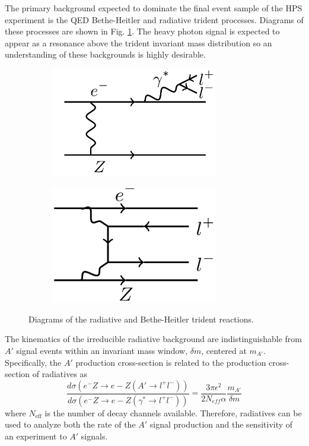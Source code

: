 The primary background expected to dominate the final event sample of the HPS 
experiment is the QED Bethe-Heitler and radiative trident processes.  Diagrams
of these processes are shown in Fig. \ref{fig:tridents}. The heavy photon 
signal is expected to appear as a resonance above the trident invariant mass
distribution so an understanding of these backgrounds is highly desirable. 
\begin{figure}[t]
    \begin{subfigure}{.5\textwidth}
        \centering
        \includegraphics[width=0.8\textwidth]{images/radiative.png}
    \end{subfigure}
    \begin{subfigure}{.5\textwidth}
        \centering
        \includegraphics[width=0.8\textwidth]{images/bethe-heitler.png}
    \end{subfigure}
    \caption{Diagrams of the radiative and Bethe-Heitler trident reactions.}
    \label{fig:tridents}
\end{figure}  

The kinematics of the irreducible radiative background are indistinguishable 
from $A'$ signal events 
within an invariant mass window, $\delta m$, centered at $m_{A'}$. Specifically, 
the $A'$ production cross-section is related to the production cross-section of 
radiatives as 
\begin{equation}
    \frac{d\sigma(e^-Z\rightarrow e-Z(A'\rightarrow l^+l^-))}
    {d\sigma(e^-Z\rightarrow e-Z(\gamma^*\rightarrow l^+l^-))}
    = \frac{3\pi\epsilon^{2}}{2 N_{eff} \alpha} \frac{m_{A'}}{\delta m}
\end{equation}
where $N_{\text{eff}}$ is the number of decay channels available.
Therefore, radiatives can be used to analyze both the rate of the $A'$ signal 
production and the sensitivity of an experiment to $A'$ signals.

